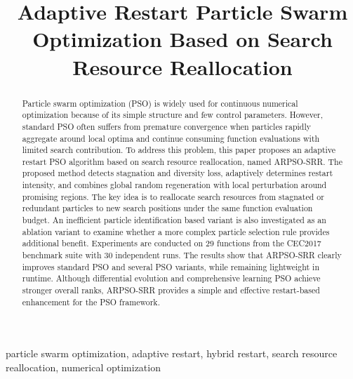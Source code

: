 \documentclass[conference]{IEEEtran}
\begin{document}
\title{Adaptive Restart Particle Swarm Optimization Based on Search Resource Reallocation}

\author{
    \and
}

\maketitle

\begin{abstract}
Particle swarm optimization (PSO) is widely used for continuous numerical optimization because of its simple structure and few control parameters. However, standard PSO often suffers from premature convergence when particles rapidly aggregate around local optima and continue consuming function evaluations with limited search contribution. To address this problem, this paper proposes an adaptive restart PSO algorithm based on search resource reallocation, named ARPSO-SRR. The proposed method detects stagnation and diversity loss, adaptively determines restart intensity, and combines global random regeneration with local perturbation around promising regions. The key idea is to reallocate search resources from stagnated or redundant particles to new search positions under the same function evaluation budget. An inefficient particle identification based variant is also investigated as an ablation variant to examine whether a more complex particle selection rule provides additional benefit. Experiments are conducted on 29 functions from the CEC2017 benchmark suite with 30 independent runs. The results show that ARPSO-SRR clearly improves standard PSO and several PSO variants, while remaining lightweight in runtime. Although differential evolution and comprehensive learning PSO achieve stronger overall ranks, ARPSO-SRR provides a simple and effective restart-based enhancement for the PSO framework.
\end{abstract}

\begin{IEEEkeywords}
particle swarm optimization, adaptive restart, hybrid restart, search resource reallocation, numerical optimization
\end{IEEEkeywords}
\end{document}
